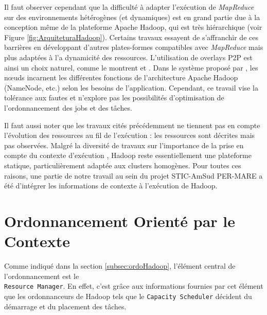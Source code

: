 Il faut observer cependant que la difficulté à adapter l'exécution de \textit{MapReduce} sur des environnements hétérogènes (et dynamiques) est en grand partie due à la conception même de la plateforme Apache Hadoop, qui est très hiérarchique (voir Figure \ref{fig:ArquiteturaHadoop}). Certains travaux essayent de s'affranchir de ces barrières en développant d'autres plates-formes compatibles avec \textit{MapReduce} mais plus adaptées à l'a dynamicité des ressources.  L'utilisation de overlays P2P est ainsi un choix naturel, comme le montrent \cite{Marozzo2012} et \cite{Steffenel20151034}. Dans le système proposé par \cite{Marozzo2012}, les n{\oe}uds incarnent les différentes fonctions de l'architecture Apache Hadoop (NameNode, etc.) selon les besoins de l'application. Cependant, ce travail vise la tolérance aux fautes et n'explore pas les possibilités d'optimisation de l'ordonnancement des jobs et des tâches. 



Il faut aussi noter que %
les travaux cités précédemment ne tiennent pas en compte l'évolution des ressources au fil de l'exécution : les ressources sont décrites mais pas observées. Malgré la diversité de travaux sur l'importance de la prise en compte du contexte d'exécution \cite{Baldauf, Maamar, Ramakrishnan2014, Najar2015}, Hadoop reste essentiellement une plateforme statique, particulièrement adaptée aux clusters homogènes. Pour toutes ces raisons, une partie de notre travail au sein du projet STIC-AmSud PER-MARE a été d'intégrer les informations de contexte à l'exécution de Hadoop.

\section{Ordonnancement Orienté par le Contexte} \label{sec:desenv}

Comme indiqué dans la section \ref{subsec:ordoHadoop}, l'élément central de l'ordonnancement est le \\\texttt{Resource Manager}. En effet, c'est grâce aux informations fournies par cet élément que les ordonnanceurs de Hadoop tels que le \texttt{Capacity Scheduler} décident du démarrage et du placement des tâches. 

